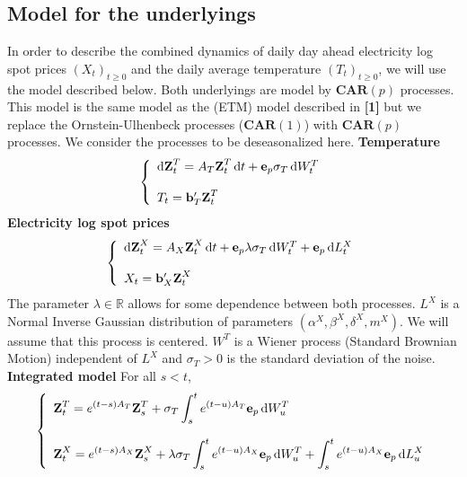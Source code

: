 \documentclass[10pt,a4paper,reqno]{amsart}
\theoremstyle{example}
\newcommand*\D{\mathop{}\!\textnormal{d}}
\begin{document}
\subsection{Model for the underlyings}
In order to describe the combined dynamics of daily day ahead electricity log spot prices $(X_t)_{t\geq 0}$ and the daily average temperature $(T_t)_{t\geq 0}$, we will use the model described below. Both underlyings are model by $\textbf{CAR}(p)$ processes. This model is the same model as the (ETM) model described in \textbf{[1]} but we replace the Ornstein-Ulhenbeck processes ($\textbf{CAR}(1)$) with $\textbf{CAR}(p)$ processes.
\newline\newline
We consider the processes to be deseasonalized here.
\newline\newline
\textbf{Temperature}
\newline
$$
\left\{
\begin{array}{l}
\D \textbf{Z}_t^T=A_T\textbf{Z}_t^T\D t+\textbf{e}_p\sigma_T\D W_t^T\\ \\
T_t =\mathbf{b}'_T\textbf{Z}_t^T
\end{array}
\right.
$$
\newline
\textbf{Electricity log spot prices}
\newline
$$
\left\{
\begin{array}{l}
\D \textbf{Z}_t^X=A_X\textbf{Z}_t^X\D t+\textbf{e}_p\lambda\sigma_T\D W_t^T+\textbf{e}_p\D L_t^X\\ \\
X_t =\mathbf{b}'_X\textbf{Z}_t^X
\end{array}
\right.
$$
\newline
The parameter $\lambda\in\mathbb{R}$ allows for some dependence between both processes.
\newline\newline
$L^X$ is a Normal Inverse Gaussian distribution of parameters $(\alpha^X,\beta^X,\delta^X,m^X)$. We will assume that this process is centered.
\newline\newline
$W^T$ is a Wiener process (Standard Brownian Motion) independent of $L^X$ and $\sigma_T>0$ is the standard deviation of the noise.
\newline\newline
\textbf{Integrated model} For all $s<t$, 
\newline
$$
\left\{
\begin{array}{l}
\displaystyle\textbf{Z}_{t}^T = e^{(t-s) A_T}\textbf{Z}_s^T + \sigma_T\int_s^{t}e^{(t-u)A_T}\textbf{e}_p\D W_u^T   \\
\\
\displaystyle\textbf{Z}_{t}^X = e^{(t-s) A_X}\textbf{Z}_s^X + \lambda\sigma_T\int_s^{t}e^{(t-u)A_X}\textbf{e}_p\D W_u^T+
\int_s^{t}e^{(t-u)A_X}\textbf{e}_p\D L_u^X \\
\end{array}
\right.
$$
\end{document}
